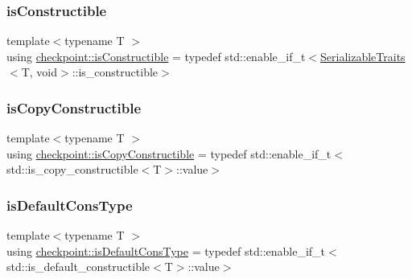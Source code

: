 \mbox{\label{namespacecheckpoint_a48ec2649d5cbd890f67ea1193cc0d51a}} 
\subsubsection{\texorpdfstring{is\+Constructible}{isConstructible}}
{\footnotesize\ttfamily template$<$typename T $>$ \\
using \hyperlink{namespacecheckpoint_a48ec2649d5cbd890f67ea1193cc0d51a}{checkpoint\+::is\+Constructible} = typedef std\+::enable\+\_\+if\+\_\+t$<$\hyperlink{structcheckpoint_1_1_serializable_traits}{Serializable\+Traits}$<$T, void$>$\+::is\+\_\+constructible$>$}

\mbox{\label{namespacecheckpoint_a60a9850fa59d4b236b2f888baf135a95}} 
\subsubsection{\texorpdfstring{is\+Copy\+Constructible}{isCopyConstructible}}
{\footnotesize\ttfamily template$<$typename T $>$ \\
using \hyperlink{namespacecheckpoint_a60a9850fa59d4b236b2f888baf135a95}{checkpoint\+::is\+Copy\+Constructible} = typedef std\+::enable\+\_\+if\+\_\+t$<$std\+::is\+\_\+copy\+\_\+constructible$<$T$>$\+::value$>$}

\mbox{\label{namespacecheckpoint_a58224a3b056d9e2aa73d563871981a7d}} 
\subsubsection{\texorpdfstring{is\+Default\+Cons\+Type}{isDefaultConsType}}
{\footnotesize\ttfamily template$<$typename T $>$ \\
using \hyperlink{namespacecheckpoint_a58224a3b056d9e2aa73d563871981a7d}{checkpoint\+::is\+Default\+Cons\+Type} = typedef std\+::enable\+\_\+if\+\_\+t$<$std\+::is\+\_\+default\+\_\+constructible$<$T$>$\+::value$>$}

